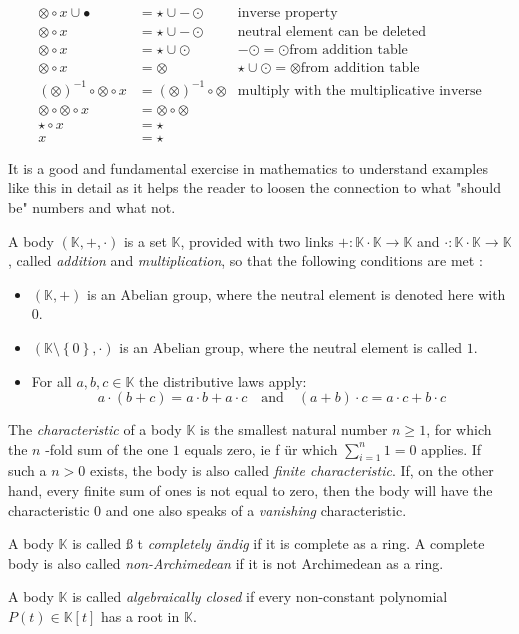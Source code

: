 \begin{example}
\begin{align*}
\otimes \circ x \cup \bullet &= \star \cup -\odot & \text{inverse property}\\
\otimes \circ x &= \star \cup -\odot & \text{neutral element can be deleted} \\
\otimes \circ x &= \star \cup \odot & -\odot = \odot \text{from addition table} \\
\otimes \circ x &= \otimes  & \star \cup \odot = \otimes \text{from addition table}\\
(\otimes)^{-1}\circ \otimes \circ x &= (\otimes)^{-1}\circ \otimes & \text{multiply with the multiplicative inverse}\\
\otimes\circ \otimes \circ x &= \otimes\circ \otimes\\
\star \circ x &= \star\\
x &= \star
\end{align*}
\end{example}
It is a good and fundamental exercise in mathematics to understand examples like this in detail as it helps the reader to loosen the connection to what "should be" numbers and what not.
\begin{definition}[body]
A body $ (\mathbb{K}, +, \cdot) $ is a set $ \mathbb{K} $, provided with two links $ +: \mathbb{K} \cdot \mathbb{K} \to \mathbb{K} $ and $ \cdot: \mathbb{K} \cdot \mathbb{K} \to \mathbb{K} $, called \textit{addition} and \textit{multiplication}, so that the following conditions are met :
\begin{itemize}
\item $ \left (\mathbb{K}, + \right) $ is an Abelian group, where the neutral element is denoted here with $ 0 $.
\item $ \left (\mathbb{K} \setminus \left \{0 \right \}, \cdot \right) $ is an Abelian group, where the neutral element is called $ 1 $.
\item For all $ a, b, c \in \mathbb{K} $ the distributive laws apply:
$$ a \cdot \left (b + c \right) = a \cdot b + a \cdot c \quad \text{and} \quad
\left (a + b \right) \cdot c = a \cdot c + b \cdot c $$
\end{itemize}
The \textit{characteristic} of a body $ \mathbb{K} $ is the smallest natural number $ n \geq 1 $, for which the $ n $ -fold sum of the one $ 1 $ equals zero, ie f \"ur which $ \sum_{i = 1} ^ n 1 = 0 $ applies.
If such a $ n> 0 $ exists, the body is also called \textit{finite characteristic}. If, on the other hand, every finite sum of ones is not equal to zero, then the body will have the characteristic $ 0 $ and one also speaks of a \textit{vanishing} characteristic.

A body $ \mathbb{K} $ is called \ss{} t \textit{completely \"andig} if
it is complete as a ring. A complete body
is also called \textit{non-Archimedean} if it is not Archimedean as a ring.

A body $ \mathbb{K} $ is called \textit{algebraically closed} if every non-constant polynomial $ P (t) \in \mathbb{K} [t] $
has a root in $ \mathbb{K} $.
\end{definition}

